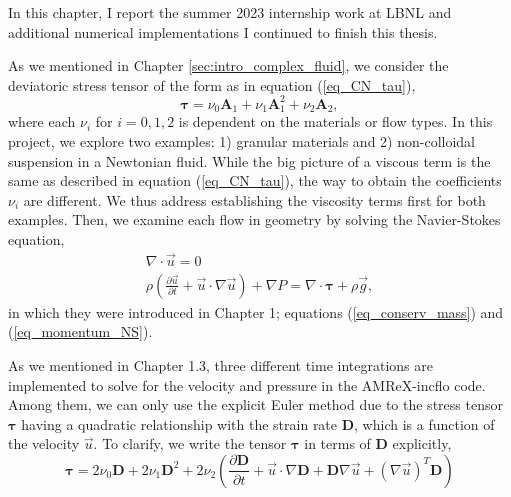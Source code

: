 \par
In this chapter, I report the summer 2023 internship work at LBNL and additional numerical implementations I continued to finish this thesis.

As we mentioned in Chapter \ref{sec:intro_complex_fluid}, we consider the deviatoric stress tensor of the form as in equation (\ref{eq_CN_tau}), 
\begin{equation}
  \boldsymbol{\tau} =
  \nu_0  \bm{A}_1 +  \nu_1  \bm{A}_1^2 + \nu_2 \bm{A}_2 ,
\nonumber
\end{equation}
where each $\nu_i$ for $i = 0,1,2$ is dependent on the materials or flow types. In this project, we explore two examples: 1) granular materials and 2) non-colloidal suspension in a Newtonian fluid. While the big picture of a viscous term is the same as described in equation (\ref{eq_CN_tau}), the way to obtain the coefficients $\nu_i$ are different. We thus address establishing the viscosity terms first for both examples. Then, we examine each flow in geometry by solving the Navier-Stokes equation,
\begin{align}
  \nabla \cdot \vec{u} = 0 
  \nonumber \\
  \rho 
  \left( 
     \frac{\partial \vec{u}}{\partial t} + \vec{u}\cdot \nabla \vec{u}
  \right)
  + \nabla P 
    = \nabla \cdot   \bm{\tau} 
    +  \rho  \vec{g} ,
  \nonumber
  \end{align}
in which they were introduced in Chapter 1; equations (\ref{eq_conserv_mass}) and (\ref{eq_momentum_NS}).
\par
As we mentioned in Chapter 1.3, three different time integrations are implemented to solve for the velocity and pressure in the AMReX-incflo code. Among them, we can only use the explicit Euler method due to the stress tensor $\bm{\tau}$ having a quadratic relationship with the strain rate $\bm{D}$, which is a function of the velocity $\vec{u}$. 
To clarify, we write the tensor $\bm{\tau}$ in terms of $\bm{D}$ explicitly,
\begin{equation}
  \boldsymbol{\tau} =
  2 \nu_0  \bm{D} +  2 \nu_1  \bm{D}^2 
  + 2\nu_2 \left(
    \frac{\partial \bm{D}}{\partial t} + 
     \vec{u} \cdot \nabla \bm{D}
    +\bm{D} \nabla \vec{u}+ \left(\nabla \vec{u} \right)^T \bm{D} 
   \right)
\end{equation}
